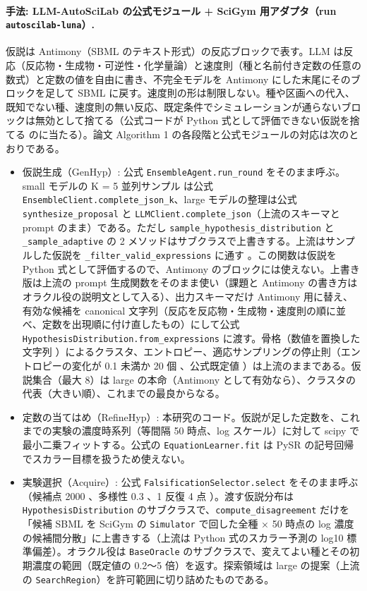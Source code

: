 \documentclass{article}
\begin{document}
\paragraph{手法: LLM-AutoSciLab の公式モジュール + SciGym 用アダプタ（run \texttt{autoscilab-luna}）.}
仮説は Antimony（SBML のテキスト形式）の反応ブロックで表す。LLM は反応（反応物・生成物・可逆性・化学量論）と速度則（種と名前付き定数の任意の数式）と定数の値を自由に書き、不完全モデルを Antimony にした末尾にそのブロックを足して SBML に戻す。速度則の形は制限しない。種や区画への代入、既知でない種、速度則の無い反応、既定条件でシミュレーションが通らないブロックは無効として捨てる（公式コードが Python 式として評価できない仮説を捨てる \cite[s2.p29]{kabra-2026-llm} のに当たる）。論文 Algorithm 1 の各段階と公式モジュールの対応は次のとおりである。
\begin{itemize}
\item 仮説生成（GenHyp）: 公式 \texttt{EnsembleAgent.run\_round} \cite[s2.p26]{kabra-2026-llm} をそのまま呼ぶ。small モデルの K = 5 並列サンプル \cite[s2.p9]{kabra-2026-llm} は公式 \texttt{EnsembleClient.complete\_json\_k}、large モデルの整理は公式 \texttt{synthesize\_proposal} \cite[s2.p37]{kabra-2026-llm} と \texttt{LLMClient.complete\_json}（上流のスキーマと prompt のまま）である。ただし \texttt{sample\_hypothesis\_distribution} と \texttt{\_sample\_adaptive} の 2 メソッドはサブクラスで上書きする。上流はサンプルした仮説を \texttt{\_filter\_valid\_expressions} に通す \cite[s2.p29]{kabra-2026-llm}。この関数は仮説を Python 式として評価するので、Antimony のブロックには使えない。上書き版は上流の prompt 生成関数をそのまま使い（課題と Antimony の書き方はオラクル役の説明文として入る）、出力スキーマだけ Antimony 用に替え、有効な候補を canonical 文字列（反応を反応物・生成物・速度則の順に並べ、定数を出現順に付け直したもの）にして公式 \texttt{HypothesisDistribution.from\_expressions} \cite[s2.p27]{kabra-2026-llm} に渡す。骨格（数値を置換した文字列 \cite[s2.p28]{kabra-2026-llm}）によるクラスタ、エントロピー、適応サンプリングの停止則（エントロピーの変化が 0.1 未満か 20 個 \cite[s2.p10]{kabra-2026-llm}、公式既定値 \cite[s2.p30, s2.p31]{kabra-2026-llm}）は上流のままである。仮説集合（最大 8）は large の本命（Antimony として有効なら）、クラスタの代表（大きい順）、これまでの最良からなる。
\item 定数の当てはめ（RefineHyp）: 本研究のコード。仮説が足した定数を、これまでの実験の濃度時系列（等間隔 50 時点、log スケール）に対して scipy で最小二乗フィットする。公式の \texttt{EquationLearner.fit} は PySR の記号回帰でスカラー目標を扱うため使えない。
\item 実験選択（Acquire）: 公式 \texttt{FalsificationSelector.select} \cite[s2.p22]{kabra-2026-llm} をそのまま呼ぶ（候補点 2000 \cite[s2.p15]{kabra-2026-llm}、多様性 0.3 \cite[s2.p16]{kabra-2026-llm}、1 反復 4 点 \cite[s2.p19]{kabra-2026-llm}）。渡す仮説分布は \texttt{HypothesisDistribution} のサブクラスで、\texttt{compute\_disagreement} だけを「候補 SBML を SciGym の \texttt{Simulator} で回した全種 × 50 時点の log 濃度の候補間分散」に上書きする（上流は Python 式のスカラー予測の log10 標準偏差）。オラクル役は \texttt{BaseOracle} のサブクラスで、変えてよい種とその初期濃度の範囲（既定値の 0.2〜5 倍）を返す。探索領域は large の提案（上流の \texttt{SearchRegion}）を許可範囲に切り詰めたものである。

\end{itemize}
\end{document}

